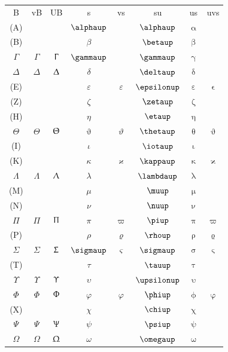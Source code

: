 \documentclass[11pt]{article}
\newcommand{\1}{ {\mathds{1}} }
\renewcommand{\alpha  }{\mathit{\alphaup}   }
\renewcommand{\epsilon}{\varepsilon}
\renewcommand{\phi    }{\varphi    }
\renewcommand{\theta  }{\upvartheta}
\renewcommand{\gamma  }{\gammaup   }
\renewcommand{\sigma  }{\sigmaup   }
\begin{document}
\begin{tabular}{cccccccc}
B 			&vB				&UB				&s			&vs				&su				& us			& uvs				\\
	(A)		&				&				&$\alpha$	&				&$\alphaup$		&$\upalpha$		&					\\
	(B)		&				&				&$\beta$	&				&$\betaup$		&$\upbeta$		&					\\
$\Gamma$	&$\varGamma$	&$\Upgamma$		&$\gamma$	&				&$\gammaup$		&$\upgamma$		&					\\
$\Delta$	&$\varDelta$	&$\Updelta$		&$\delta$	&				&$\deltaup$		&$\updelta$		&					\\
	(E)		&				&				&$\epsilon$	&$\varepsilon$	&$\epsilonup$	&$\upepsilon$	&$\upvarepsilon$	\\
	(Z)		&				&				&$\zeta$	&				&$\zetaup$		&$\upzeta$		&					\\
	(H)		&				&				&$\eta$		&				&$\etaup$		&$\upeta$		&					\\
$\Theta$	&$\varTheta$	&$\Uptheta$		&$\theta$	&$\vartheta$	&$\thetaup$		&$\uptheta$		&$\upvartheta$		\\
	(I)		&				&				&$\iota$	&				&$\iotaup$		&$\upiota$		&					\\
	(K)		&				&				&$\kappa$	&$\varkappa$	&$\kappaup$		&$\upkappa$		&$\upvarkappa$		\\
$\Lambda$	&$\varLambda$	&$\Uplambda$	&$\lambda$	&				&$\lambdaup$	&$\uplambda$	&					\\
	(M)		&				&				&$\mu$		&				&$\muup$		&$\upmu$		&					\\
	(N)		&				&				&$\nu$		&				&$\nuup$		&$\upnu$		&					\\
$\Pi$		&$\varPi$		&$\Uppi$		&$\pi$		&$\varpi$		&$\piup$		&$\uppi$		&$\upvarpi$			\\
	(P)		&				&				&$\rho$		&$\varrho$		&$\rhoup$		&$\uprho$		&$\upvarrho$		\\
$\Sigma$	&$\varSigma$	&$\Upsigma$		&$\sigma$	&$\varsigma$	&$\sigmaup$		&$\upsigma$		&$\upvarsigma$		\\
	(T)		&				&				&$\tau$		&				&$\tauup$		&$\uptau$		&					\\
$\Upsilon$	&$\varUpsilon$	&$\Upupsilon$	&$\upsilon$	&				&$\upsilonup$	&$\upupsilon$	&					\\
$\Phi$		&$\varPhi$		&$\Upphi$		&$\phi$		&$\varphi$		&$\phiup$		&$\upphi$		&$\upvarphi$		\\
	(X)		&				&				&$\chi$		&				&$\chiup$		&$\upchi$		&					\\
$\Psi$		&$\varPsi$		&$\Uppsi$		&$\psi$		&				&$\psiup$		&$\uppsi$		&					\\
$\Omega$	&$\varOmega$	&$\Upomega$		&$\omega$	&				&$\omegaup$		&$\upomega$		&					\\
\end{tabular}
\end{document}
